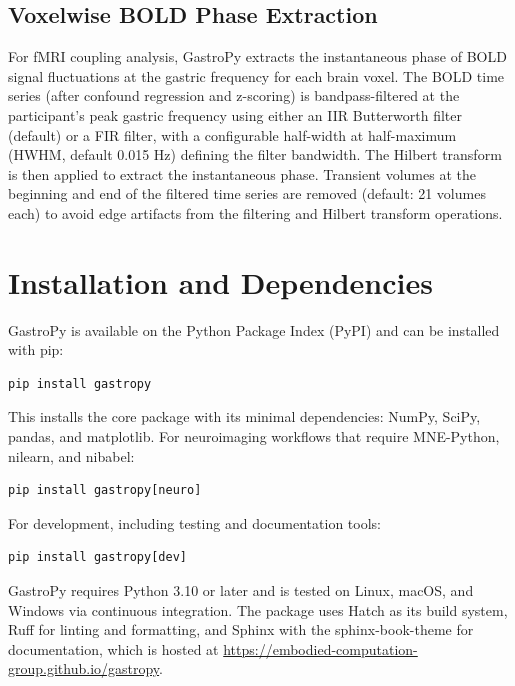 \documentclass[12pt]{article}
\begin{document}
\subsection{Voxelwise BOLD Phase Extraction}

For fMRI coupling analysis, GastroPy extracts the instantaneous phase of BOLD
signal fluctuations at the gastric frequency for each brain voxel. The BOLD
time series (after confound regression and z-scoring) is bandpass-filtered at
the participant's peak gastric frequency using either an IIR Butterworth filter
(default) or a FIR filter, with a configurable half-width at half-maximum
(HWHM, default 0.015 Hz) defining the filter bandwidth. The Hilbert transform
is then applied to extract the instantaneous phase. Transient volumes at the
beginning and end of the filtered time series are removed (default: 21 volumes
each) to avoid edge artifacts from the filtering and Hilbert transform
operations.

\section{Installation and Dependencies}

GastroPy is available on the Python Package Index (PyPI) and can be installed
with pip:

\begin{lstlisting}
pip install gastropy
\end{lstlisting}

This installs the core package with its minimal dependencies: NumPy, SciPy,
pandas, and matplotlib. For neuroimaging workflows that require MNE-Python,
nilearn, and nibabel:

\begin{lstlisting}
pip install gastropy[neuro]
\end{lstlisting}

For development, including testing and documentation tools:

\begin{lstlisting}
pip install gastropy[dev]
\end{lstlisting}

GastroPy requires Python 3.10 or later and is tested on Linux, macOS, and
Windows via continuous integration. The package uses Hatch as its build system,
Ruff for linting and formatting, and Sphinx with the sphinx-book-theme for
documentation, which is hosted at
\url{https://embodied-computation-group.github.io/gastropy}.
\end{document}
